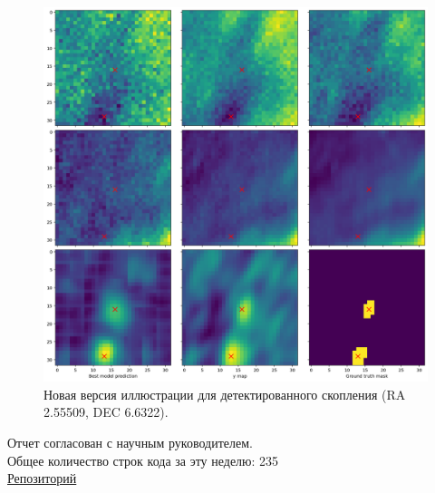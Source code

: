 \documentclass{article}
\begin{document}
\begin{figure}[h]
\includegraphics[width=0.6\linewidth]{cluster}
\caption{Новая версия иллюстрации для детектированного скопления (RA 2.55509, DEC 6.6322).}
\label{Fig:Cluster}
\end{figure}

Отчет согласован с научным руководителем.\\
Общее количество строк кода за эту неделю: 235\\
\href{https://github.com/rt2122/data-segmentation-2}{Репозиторий}\\ 
\end{document}
